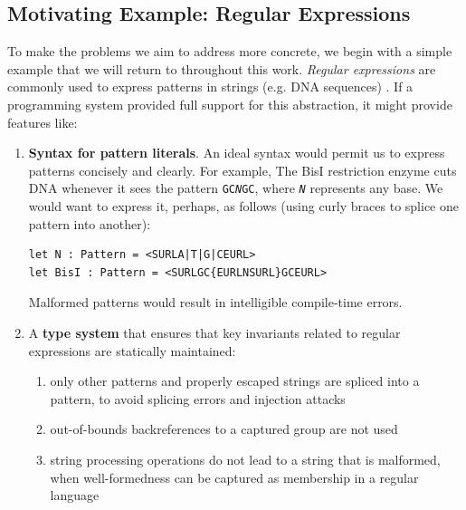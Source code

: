 \subsection{Motivating Example: Regular Expressions}\label{regex}
To make the problems we aim to address more concrete, we begin with a simple example that we will return to throughout this work. \emph{Regular expressions} are commonly used to express patterns in strings (e.g. DNA sequences) \cite{Thompson:1968:PTR:363347.363387}. If a programming system provided full support for this abstraction, it might  provide features like:

\begin{enumerate}
\item \textbf{Syntax for pattern literals}. An ideal syntax would permit us to express patterns concisely and clearly. For example, The BisI restriction enzyme cuts DNA whenever it sees the pattern \texttt{GC\textit{N}GC}, where \texttt{\textit{N}} represents any base. We would want to express it, perhaps, as follows (using curly braces to splice one pattern into another):
\begin{lstlisting}[numbers=none]
let N : Pattern = <SURLA|T|G|CEURL>
let BisI : Pattern = <SURLGC{EURLNSURL}GCEURL>\end{lstlisting}
Malformed patterns would result in intelligible {compile-time} errors.
\item A \textbf{type system} that ensures that key invariants related to regular expressions are statically maintained:
	\begin{enumerate}
	\item only other patterns and properly escaped strings are spliced into a pattern, to avoid splicing errors and injection attacks \cite{owasp2013, Bravenboer:2007:PIA:1289971.1289975}
	\item out-of-bounds backreferences to a captured group are not used \cite{spishak2012type}
	\item string processing operations do not lead to a string that is malformed, when well-formedness can be captured as membership in a regular language \cite{fulton-thesis,HosoyaVouillonPierce2000ICFP}
	\end{enumerate}

\end{enumerate}

